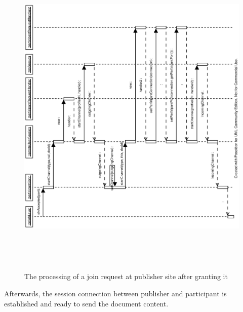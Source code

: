 \begin{figure}[htb]
 \centering
 \includegraphics[width=14.67cm,height=16cm,angle=270]{../images/finalreport/network_joinRequest_sequence2.eps}
 \caption{The processing of a join request at publisher site after granting it}
 \label{fig:network.protocol.joinrequest2}
\end{figure}


Afterwards, the session connection between publisher and participant is established and ready to send the document content.



